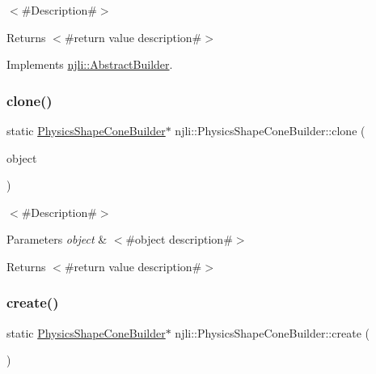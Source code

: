 $<$\#\+Description\#$>$

\begin{DoxyReturn}{Returns}
$<$\#return value description\#$>$ 
\end{DoxyReturn}


Implements \mbox{\hyperlink{classnjli_1_1_abstract_builder_aa1d220053e182c37b31b427499c6eacf}{njli\+::\+Abstract\+Builder}}.

\mbox{\label{classnjli_1_1_physics_shape_cone_builder_a740146e491d77b354a8ba7c0bbcec109}} 
\subsubsection{\texorpdfstring{clone()}{clone()}}
{\footnotesize\ttfamily static \mbox{\hyperlink{classnjli_1_1_physics_shape_cone_builder}{Physics\+Shape\+Cone\+Builder}}$\ast$ njli\+::\+Physics\+Shape\+Cone\+Builder\+::clone (\begin{DoxyParamCaption}\item[{const \mbox{\hyperlink{classnjli_1_1_physics_shape_cone_builder}{Physics\+Shape\+Cone\+Builder}} \&}]{object }\end{DoxyParamCaption})\hspace{0.3cm}{\ttfamily [static]}}

$<$\#\+Description\#$>$


\begin{DoxyParams}{Parameters}
{\em object} & $<$\#object description\#$>$\\
\hline
\end{DoxyParams}
\begin{DoxyReturn}{Returns}
$<$\#return value description\#$>$ 
\end{DoxyReturn}
\mbox{\label{classnjli_1_1_physics_shape_cone_builder_ae90e688c959bed817ee008755f7f8284}} 
\subsubsection{\texorpdfstring{create()}{create()}}
{\footnotesize\ttfamily static \mbox{\hyperlink{classnjli_1_1_physics_shape_cone_builder}{Physics\+Shape\+Cone\+Builder}}$\ast$ njli\+::\+Physics\+Shape\+Cone\+Builder\+::create (\begin{DoxyParamCaption}{ }\end{DoxyParamCaption})\hspace{0.3cm}{\ttfamily [static]}}

